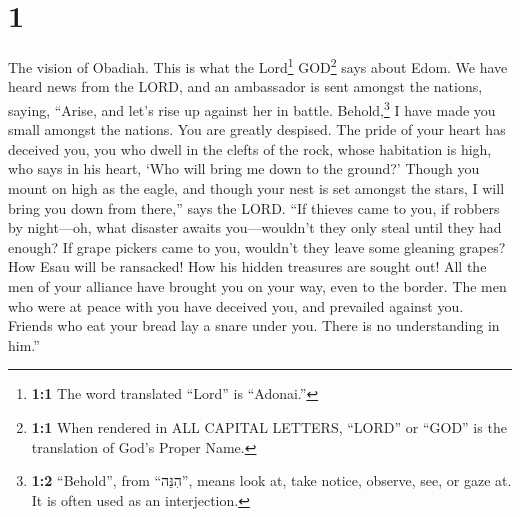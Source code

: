 \hypertarget{section}{%
\section{1}\label{section}}

 The vision of Obadiah. This is what the Lord\footnote{\textbf{1:1}
  The word translated ``Lord'' is ``Adonai.''} GOD\footnote{\textbf{1:1}
  When rendered in ALL CAPITAL LETTERS, ``LORD'' or ``GOD'' is the
  translation of God's Proper Name.} says about Edom. We have heard news
from the LORD, and an ambassador is sent amongst the nations, saying,
``Arise, and let's rise up against her in battle. 
Behold,\footnote{\textbf{1:2} ``Behold'', from ``הִנֵּה'', means look
  at, take notice, observe, see, or gaze at. It is often used as an
  interjection.} I have made you small amongst the nations. You are
greatly despised.  The pride of your heart has deceived
you, you who dwell in the clefts of the rock, whose habitation is high,
who says in his heart, `Who will bring me down to the ground?'
 Though you mount on high as the eagle, and though your
nest is set amongst the stars, I will bring you down from there,'' says
the LORD.  ``If thieves came to you, if robbers by
night---oh, what disaster awaits you---wouldn't they only steal until
they had enough? If grape pickers came to you, wouldn't they leave some
gleaning grapes?  How Esau will be ransacked! How his
hidden treasures are sought out!  All the men of your
alliance have brought you on your way, even to the border. The men who
were at peace with you have deceived you, and prevailed against you.
Friends who eat your bread lay a snare under you. There is no
understanding in him.''

